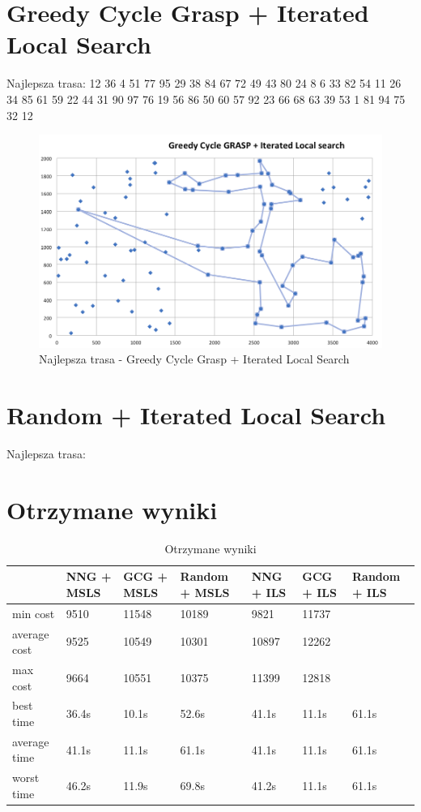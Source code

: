\documentclass[a4paper 10pt]{article}
\begin{document}
\newpage
\section{Greedy Cycle Grasp + Iterated Local Search}
Najlepsza trasa: 12
36
4 
51
77
95
29
38
84
67
72
49
43
80
24
8 
6 
33
82
54
11
26
34
85
61
59
22
44
31
90
97
76
19
56
86
50
60
57
92
23
66
68
63
39
53
1 
81
94
75
32
12

\begin{figure} [H]
\centering
\includegraphics[angle=0,width = 1\textwidth, height=!]{images/GCG_ILS.png}
\caption{Najlepsza trasa - Greedy Cycle Grasp + Iterated Local Search}
\label{Rys. NN}
\end{figure}

\newpage
\section{Random + Iterated Local Search}
Najlepsza trasa: 

\newpage
\section{Otrzymane wyniki}
\begin{table}[H]
\centering
\caption{Otrzymane wyniki}
\label{my-label}
\begin{tabular}{|l|l|l|l|l|l|l|}
\hline
             & NNG + MSLS & GCG + MSLS & Random + MSLS & NNG + ILS & GCG + ILS & Random + ILS \\ \hline
min cost     & 9510 & 11548 & 10189 & 9821 & 11737 &  \\ \hline
average cost & 9525 & 10549 & 10301 & 10897 & 12262 &  \\ \hline
max cost     & 9664 & 10551 & 10375 & 11399 & 12818 &  \\ \hline
best time    & 36.4s & 10.1s & 52.6s & 41.1s & 11.1s & 61.1s \\ \hline
average time & 41.1s & 11.1s & 61.1s & 41.1s & 11.1s & 61.1s \\ \hline
worst time   & 46.2s & 11.9s & 69.8s & 41.2s & 11.1s & 61.1s \\ \hline 
\end{tabular}
\end{table}
\end{document}
